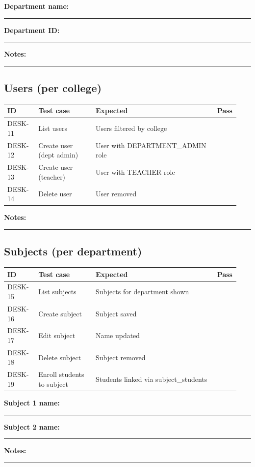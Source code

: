 \documentclass[11pt,a4paper,oneside]{article}
\newcommand{\chk}{\fbox{\rule{0pt}{1.05ex}\rule{1.05ex}{0pt}}}
\newcommand{\fillin}[1][3.5cm]{\rule{#1}{0.4pt}}
\newcommand{\fillinlong}{\rule{0.72\textwidth}{0.4pt}}
\newcommand{\notesblock}{\par\smallskip\noindent\textbf{Notes:}\ \fillinlong\par\smallskip}
\newcommand{\fieldline}[1]{\par\smallskip\noindent\textbf{#1}\ \fillin\par}
\newcommand{\tcheadfour}{%
  \toprule
  \textbf{ID} & \textbf{Test case} & \textbf{Expected} & \textbf{Pass} \\
  \midrule
}
\begin{document}
\fieldline{Department name:}
\fieldline{Department ID:}
\notesblock

\subsection{Users (per college)}

\small
\begin{tabular}{@{}>{\raggedright\arraybackslash}p{0.13\linewidth} >{\raggedright\arraybackslash}p{0.24\linewidth} >{\raggedright\arraybackslash}p{0.51\linewidth} >{\centering\arraybackslash}p{0.06\linewidth}@{}}
  \tcheadfour
  DESK-11 & List users              & Users filtered by college           & \chk \\
  DESK-12 & Create user (dept admin)& User with DEPARTMENT\_ADMIN role    & \chk \\
  DESK-13 & Create user (teacher)   & User with TEACHER role              & \chk \\
  DESK-14 & Delete user             & User removed                        & \chk \\
  \bottomrule
\end{tabular}
\normalsize

\notesblock

\subsection{Subjects (per department)}

\small
\begin{tabular}{@{}>{\raggedright\arraybackslash}p{0.13\linewidth} >{\raggedright\arraybackslash}p{0.24\linewidth} >{\raggedright\arraybackslash}p{0.51\linewidth} >{\centering\arraybackslash}p{0.06\linewidth}@{}}
  \tcheadfour
  DESK-15 & List subjects              & Subjects for department shown        & \chk \\
  DESK-16 & Create subject             & Subject saved                        & \chk \\
  DESK-17 & Edit subject               & Name updated                         & \chk \\
  DESK-18 & Delete subject             & Subject removed                      & \chk \\
  DESK-19 & Enroll students to subject & Students linked via subject\_students & \chk \\
  \bottomrule
\end{tabular}
\normalsize

\fieldline{Subject 1 name:}
\fieldline{Subject 2 name:}
\notesblock
\end{document}
